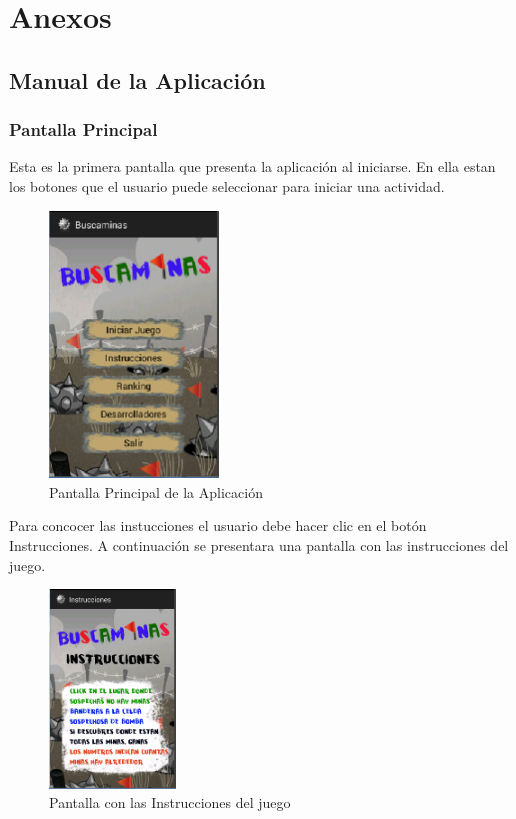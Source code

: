 \documentclass[11pt]{article} %
\begin{document}
\newpage
\thispagestyle{empty}

\section{\textbf{Anexos}}
\subsection{\textbf{Manual de la Aplicaci\' on}}
\subsubsection{\textbf{Pantalla Principal}}
Esta es la primera pantalla que presenta la aplicaci\' on al iniciarse. En ella estan los botones que el usuario puede seleccionar para iniciar una actividad.
\begin{center}

	\begin{figure}[h!]
  		\centering
    		\includegraphics[width=0.4\textwidth]{imagenes/PantallaPrincipal.PNG}
  		\caption{Pantalla Principal de la Aplicaci\' on}
		\label{fig:pantallaprincipal}
	\end{figure}
\end{center}

Para concocer las instucciones el usuario debe hacer clic en el bot\'on Instrucciones. A continuaci\'on se presentara una pantalla con las instrucciones del juego.
\begin{center}

	\begin{figure}[h!]
  		\centering
    		\includegraphics[width=0.3\textwidth]{imagenes/Instrucciones.PNG}
  		\caption{Pantalla con las Instrucciones del juego}
		\label{fig:instrucciones}
	\end{figure}
\end{center}
\end{document}
